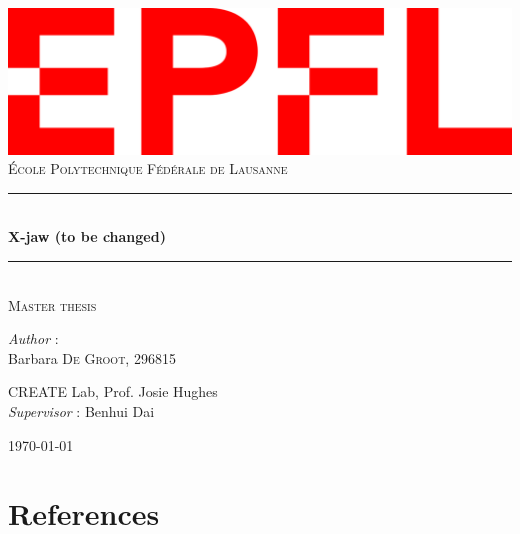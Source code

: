 \documentclass[11pt,a4paper]{article}
\begin{document}
    \begin{titlepage}
    \newcommand{\HRule}{\rule{\linewidth}{0.5mm}}
    \center
    \includegraphics[scale=0.25]{figures/logo.png}\\[0.4cm]

    \textsc{\LARGE École Polytechnique Fédérale de Lausanne}\\[1.5cm]
    \vfill
    
    \HRule \\[0.4cm]
    {\huge \bfseries X-jaw (to be changed)}\\
    \HRule
    \\[0.5cm]
    
    \textsc{\Large Master thesis}
    \vfill 
   
    \centering
    \bigskip
    \textit{Author} : \\[0.2cm]

    Barbara \textsc{De Groot, 296815}\\

    \bigskip
    \bigskip

    CREATE Lab, Prof. Josie Hughes\\
    \textit{Supervisor} : Benhui Dai\\[0.2cm]

    \bigskip
    \bigskip
    
    {\large \today}\\[2cm]
    \end{titlepage}

\newpage
\tableofcontents

\newpage
%






\newpage
\section{References}
\printbibliography[heading=none]

% 
% 
\end{document}
